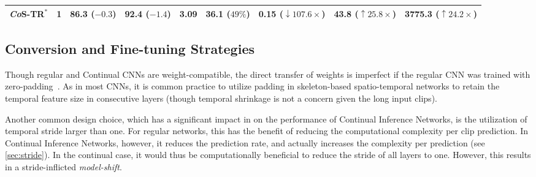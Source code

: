 \documentclass[journal]{IEEEtran}
\theoremstyle{definition}
\begin{document}
\begin{table*}[!tbp]
\begin{center}
{\begin{tabular}{lclllllll}
    \textit{Co}S-TR$^*$                 & 1     & 86.3 \textcolor{lred}{($-0.3$)}     & 92.4 \textcolor{lred}{($-1.4$)}     & 3.09   & \phantom{0}36.1 \phantom{0}\textcolor{lgreen}{($49\%$)}       & \phantom{0}0.15 \textcolor{lgreen}{($\downarrow107.6\times$)}         & 43.8 \textcolor{lgreen}{($\uparrow25.8\times$)}     & 3775.3 \textcolor{lgreen}{($\uparrow24.2\times$)} \\
    
    \bottomrule
\end{tabular}
}
\end{center}
\end{table*}


\subsection{Conversion and Fine-tuning Strategies}\label{sec:ft-strategies}
Though regular and Continual CNNs are weight-compatible, the direct transfer of weights is imperfect if the regular CNN was trained with zero-padding~\cite{hedegaard2021continual}.
As in most CNNs, it is common practice to utilize padding in skeleton-based spatio-temporal networks to retain the temporal feature size in consecutive layers (though temporal shrinkage is not a concern given the long input clips).

Another common design choice, which has a significant impact in on the performance of Continual Inference Networks, is the utilization of temporal stride larger than one. 
For regular networks, this has the benefit of reducing the computational complexity per clip prediction. 
In Continual Inference Networks, however, it reduces the prediction rate, and actually increases the complexity per prediction (see \cref{sec:stride}).
In the continual case, it would thus be computationally beneficial to reduce the stride of all layers to one. However, this results in a stride-inflicted \textit{model-shift}.
\end{document}
